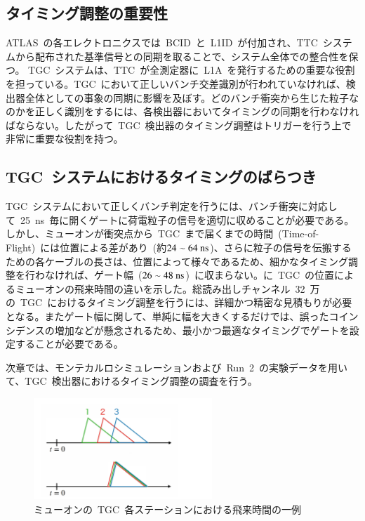 \subsection{タイミング調整の重要性}
ATLAS~の各エレクトロニクスでは~BCID~と~L1ID~が付加され、TTC~システムから配布された基準信号との同期を取ることで、システム全体での整合性を保つ。
TGC~システムは、TTC~が全測定器に~L1A~を発行するための重要な役割を担っている。TGC~において正しいバンチ交差識別が行われていなければ、検出器全体としての事象の同期に影響を及ぼす。どのバンチ衝突から生じた粒子なのかを正しく識別をするには、各検出器においてタイミングの同期を行わなければならない。したがって~TGC~検出器のタイミング調整はトリガーを行う上で非常に重要な役割を持つ。

\subsection{TGC~システムにおけるタイミングのばらつき}
TGC~システムにおいて正しくバンチ判定を行うには、バンチ衝突に対応して~25~ns~毎に開くゲートに荷電粒子の信号を適切に収めることが必要である。
しかし、ミューオンが衝突点から~TGC~まで届くまでの時間~(Time-of-Flight)~には位置による差があり~(約$\rm{24\sim64~ns}$)、さらに粒子の信号を伝搬するための各ケーブルの長さは、位置によって様々であるため、細かなタイミング調整を行わなければ、ゲート幅~($\rm{26\sim48~ns}$)~に収まらない。に~TGC~の位置によるミューオンの飛来時間の違いを示した。総読み出しチャンネル~32~万の~TGC~におけるタイミング調整を行うには、詳細かつ精密な見積もりが必要となる。またゲート幅に関して、単純に幅を大きくするだけでは、誤ったコインシデンスの増加などが懸念されるため、最小かつ最適なタイミングでゲートを設定することが必要である。

次章では、モンテカルロシミュレーションおよび~Run~2~の実験データを用いて、TGC~検出器におけるタイミング調整の調査を行う。

\begin{figure}[H]
    \centering   
    \includegraphics[width=0.6\textwidth,page=8]{img/slide/slide.pdf}
    \caption{ミューオンの~TGC~各ステーションにおける飛来時間の一例}
    \label{fig:tof}
\end{figure}
